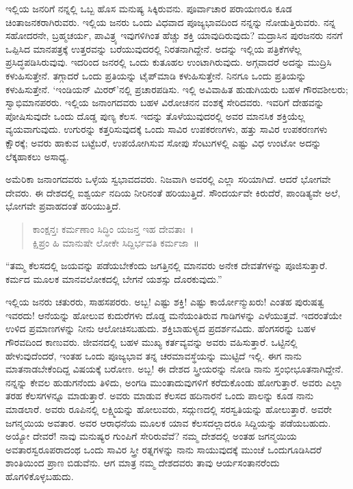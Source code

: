 ಇಲ್ಲಿಯ ಜನರಿಗೆ ನನ್ನಲ್ಲಿ ಒಬ್ಬ ಹೊಸ ಮನುಷ್ಯ ಸಿಕ್ಕಿರುವನು. ಪೂರ್ವಾಚಾರ ಪರಾಯಣರೂ ಕೂಡ ಚಿಂತಾಜನಕರಾಗಿರುವರು. ಇಲ್ಲಿಯ ಜನರು ಒಂದು ವಿಧವಾದ ಪೂಜ್ಯಭಾವದಿಂದ ನನ್ನನ್ನು ನೋಡುತ್ತಿರುವರು. ನನ್ನ ಸಹೋದರನೇ, ಬ್ರಹ್ಮಚರ್ಯ, ಪಾವಿತ್ರ್ಯ ಇವುಗಳಿಗಿಂತ ಹೆಚ್ಚು ಶಕ್ತಿ ಯಾವುದಿರುವುದು? ಮದ್ರಾಸಿನ ಪುರಜನರು ನನಗೆ ಒಪ್ಪಿಸಿದ ಮಾನಪತ್ರಕ್ಕೆ ಉತ್ತರವನ್ನು ಬರೆಯುವುದರಲ್ಲಿ ನಿರತನಾಗಿದ್ದೇನೆ. ಅದನ್ನು ಇಲ್ಲಿಯ ಪತ್ರಿಕೆಗಳೆಲ್ಲ ಪ್ರಸಿದ್ಧಪಡಿಸಿರುವುವು. ಇದರಿಂದ ಜನರಲ್ಲಿ ಒಂದು ಕುತೂಹಲ ಉಂಟಾಗಿರುವುದು. ಅಗ್ಗವಾದರೆ ಅದನ್ನು ಮುದ್ರಿಸಿ ಕಳುಹಿಸುತ್ತೇನೆ. ತಗ್ಗಾದರೆ ಒಂದು ಪ್ರತಿಯನ್ನು ಟೈಪ್‌ಮಾಡಿ ಕಳುಹಿಸುತ್ತೇನೆ. ನಿನಗೂ ಒಂದು ಪ್ರತಿಯನ್ನು ಕಳುಹಿಸುತ್ತೇನೆ. ‘ಇಂಡಿಯನ್ ಮಿರರ್’ನಲ್ಲಿ ಪ್ರಚಾರಪಡಿಸು. ಇಲ್ಲಿ ಅವಿವಾಹಿತ ಹುಡುಗಿಯರು ಬಹಳ ಗೌರವಶೀಲರು; ಸ್ವಾಭಿಮಾನಪರರು. ಇಲ್ಲಿಯ ಜನಾಂಗದವರು ಬಹಳ ವಿರೋಚನನ ವಂಶಕ್ಕೆ ಸೇರಿದವರು. ಇವರಿಗೆ ದೇಹವನ್ನು ಪೋಷಿಸುವುದೇ ಒಂದು ದೊಡ್ಡ ಪುಣ್ಯ ಕೆಲಸ. ಇದನ್ನು ತೊಳೆಯುವುದರಲ್ಲಿ ಅವರ ಮಾನಸಿಕ ಶಕ್ತಿಯೆಲ್ಲ ವ್ಯಯವಾಗುವುದು. ಉಗುರನ್ನು ಕತ್ತರಿಸುವುದಕ್ಕೆ ಒಂದು ಸಾವಿರ ಉಪಕರಣಗಳು, ಹತ್ತು ಸಾವಿರ ಉಪಕರಣಗಳು ಕ್ಷೌರಕ್ಕೆ; ಅವರು ಹಾಕುವ ಬಟ್ಟೆಬರೆ, ಉಪಯೋಗಿಸುವ ಸೋಪು ಸೆಂಟುಗಳಲ್ಲಿ ಎಷ್ಟು ವಿಧ ಉಂಟೋ ಅದನ್ನು ಲೆಕ್ಕಹಾಕಲು ಅಸಾಧ್ಯ.

ಅಮೆರಿಕಾ ಜನಾಂಗದವರು ಒಳ್ಳೆಯ ಸ್ವಭಾವದವರು. ನಿಜವಾಗಿ ಅವರಲ್ಲಿ ಎಲ್ಲಾ ಸರಿಯಾಗಿದೆ. ಆದರೆ ಭೋಗವೇ ದೇವರು. ಈ ದೇಶದಲ್ಲಿ ಐಶ್ವರ್ಯ ನದಿಯ ನೀರಿನಂತೆ ಹರಿಯುತ್ತಿದೆ. ಸೌಂದರ್ಯವೇ ಕಿರುದೆರೆ, ಪಾಂಡಿತ್ಯವೇ ಅಲೆ, ಭೋಗವೇ ಪ್ರವಾಹದಂತೆ ಹರಿಯುತ್ತಿದೆ.

\begin{verse}
 ಕಾಂಕ್ಷನ್ತಃ ಕರ್ಮಣಾಂ ಸಿದ್ಧಿಂ ಯಜನ್ತ ಇಹ ದೇವತಾಃ~।\\
 ಕ್ಷಿಪ್ರಂ ಹಿ ಮಾನುಷೇ ಲೋಕೇ ಸಿದ್ದಿರ್ಭವತಿ ಕರ್ಮಜಾ~॥   
\end{verse}


“ತಮ್ಮ ಕೆಲಸದಲ್ಲಿ ಜಯವನ್ನು ಪಡೆಯಬೇಕೆಂದು ಜಗತ್ತಿನಲ್ಲಿ ಮಾನವರು ಅನೇಕ ದೇವತೆಗಳನ್ನು ಪೂಜಿಸುತ್ತಾರೆ. ಕರ್ಮದ ಮೂಲಕ ಮಾನವಲೋಕದಲ್ಲಿ ಬೇಗನೆ ಯಶಸ್ಸು ದೊರಕುವುದು.”

ಇಲ್ಲಿಯ ಜನರು ಚತುರರು, ಸಾಹಸಪರರು. ಅಬ್ಬ! ಎಷ್ಟು ಶಕ್ತಿ! ಎಷ್ಟು \break ಕಾರ್ಯೋನ್ಮುಖರು! ಎಂತಹ ಪುರುಷತ್ವ ಇವರದು! ಆನೆಯನ್ನು ಹೋಲುವ ಕುದುರೆಗಳು ದೊಡ್ಡ ಮನೆಯಂತಿರುವ ಗಾಡಿಗಳನ್ನು ಎಳೆಯುತ್ತವೆ. ಇದರಂತೆಯೇ ಉಳಿದ ಪ್ರಮಾಣಗಳನ್ನು ನೀನು ಆಲೋಚಿಸಬಹುದು. ಶಕ್ತಿಬಾಹುಳ್ಯದ ಪ್ರದರ್ಶನವಿದು. ಹೆಂಗಸರನ್ನು ಬಹಳ ಗೌರವದಿಂದ ಕಾಣುವರು. ಜೀವನದಲ್ಲಿ ಬಹಳ ಮುಖ್ಯ ಕರ್ತವ್ಯವನ್ನು ಅವರು ವಹಿಸುತ್ತಾರೆ. ಒಟ್ಟಿನಲ್ಲಿ ಹೇಳುವುದೆಂದರೆ, ಇಂತಹ ಒಂದು ಪೂಜ್ಯಭಾವ ತನ್ನ ಚರಮಾವಸ್ಥೆಯನ್ನು ಮುಟ್ಟಿದೆ ಇಲ್ಲಿ. ಈಗ ನಾನು ಮಾತನಾಡಬೇಕೆಂದಿದ್ದ ವಿಷಯಕ್ಕೆ ಬರೋಣ. ಅಬ್ಬ! ಈ ದೇಶದ ಸ್ತ್ರೀಯರನ್ನು ನೋಡಿ ನಾನು ಸ್ತಂಭೀಭೂತನಾಗಿದ್ದೇನೆ. ನನ್ನನ್ನು ಕೇವಲ ಹುಡುಗನೆಂದು ತಿಳಿದು, ಅಂಗಡಿ ಮುಂತಾದುವುಗಳಿಗೆ ಕರೆದುಕೊಂಡು ಹೋಗುತ್ತಾರೆ. ಅವರು ಎಲ್ಲಾ ತರಹ ಕೆಲಸಗಳನ್ನೂ ಮಾಡುತ್ತಾರೆ. ಅವರು ಮಾಡುವ ಕೆಲಸದ ಹದಿನಾರನೆ ಒಂದು ಪಾಲನ್ನು ಕೂಡ ನಾನು ಮಾಡಲಾರೆ. ಅವರು ರೂಪಿನಲ್ಲಿ ಲಕ್ಷ್ಮಿಯನ್ನು ಹೋಲುವರು, ಸದ್ಗುಣದಲ್ಲಿ ಸರಸ್ವತಿಯನ್ನು ಹೋಲುತ್ತಾರೆ. ಅವರೇ ಜಗನ್ಮಯಿಯ ಅವತಾರ. ಅವರ ಆರಾಧನೆಯ ಮೂಲಕ ಯಾವ ಕೆಲಸದಲ್ಲಾದರೂ ಸಿದ್ದಿಯನ್ನು ಪಡೆಯಬಹುದು. ಅಯ್ಯೋ ದೇವರೆ! ನಾವು ಮನುಷ್ಯರ ಗುಂಪಿಗೆ ಸೇರಿರುವೆವೆ? ನಮ್ಮ ದೇಶದಲ್ಲಿ ಅಂತಹ ಜಗನ್ಮಯಿಯ ಅವತಾರಸ್ವರೂಪರಾದಂಥ ಒಂದು ಸಾವಿರ ಸ್ತ್ರೀ ರತ್ನಗಳನ್ನು ನಾನು ಸಾಯುವುದಕ್ಕೆ ಮುಂಚೆ ಒಂದುಗೂಡಿಸಿದರೆ ಶಾಂತಿಯಿಂದ ಪ್ರಾಣ ಬಿಡುವೆನು. ಆಗ ಮಾತ್ರ ನಮ್ಮ ದೇಶದವರು ತಾವು ಆರ್ಯಸಂತಾನರೆಂದು ಹೊಗಳಿಕೊಳ್ಳಬಹುದು.

